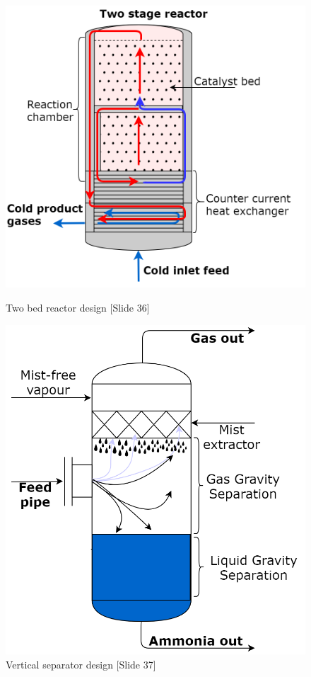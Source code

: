         
\begin{figure}[H]

   \begin{minipage}{0.48\textwidth}
     \centering
     \includegraphics[width=1.05\linewidth]{ammoniasynth/handout/graphics/reac.png}
     \caption{Two bed reactor design [Slide 36]}\label{Fig:reac}
   \end{minipage}%
   \begin{minipage}{0.48\textwidth}
     \centering
     \includegraphics[width=.9\linewidth]{ammoniasynth/handout/graphics/cond.png}
     \caption{Vertical separator design [Slide 37]}\label{Fig:cond}
   \end{minipage}%
\end{figure}



